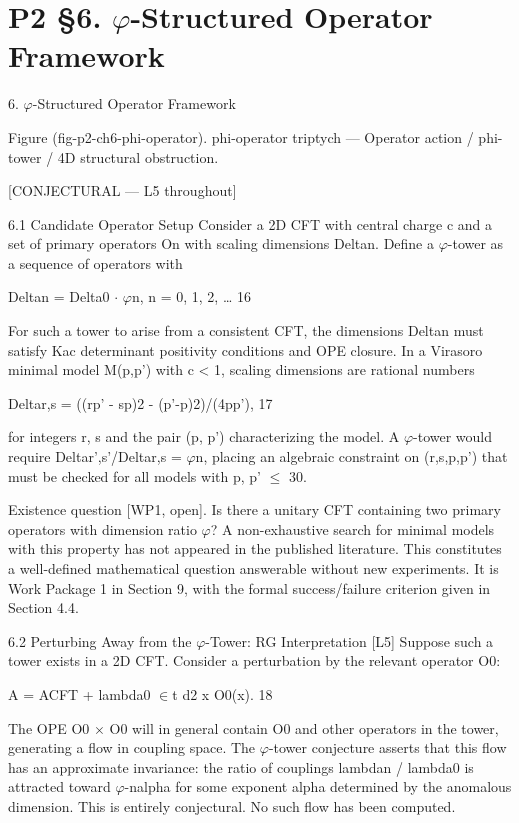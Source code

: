 
\section{P2 §6. $\varphi$-Structured Operator Framework}

6. $\varphi$-Structured Operator Framework

           Figure (fig-p2-ch6-phi-operator). phi-operator triptych --- Operator action / phi-tower / 4D
                                             structural obstruction.

  [CONJECTURAL --- L5 throughout]

  6.1 Candidate Operator Setup
  Consider a 2D CFT with central charge c and a set of primary operators On with scaling
  dimensions Deltan. Define a $\varphi$-tower as a sequence of operators with

  Deltan = Delta0 $\cdot$ $\varphi$n, n = 0, 1, 2, … 16

  For such a tower to arise from a consistent CFT, the dimensions Deltan must satisfy Kac
  determinant positivity conditions and OPE closure. In a Virasoro minimal model M(p,p')
  with c < 1, scaling dimensions are rational numbers

  Deltar,s = ((rp' - sp)2 - (p'-p)2)/(4pp'), 17

  for integers r, s and the pair (p, p') characterizing the model. A $\varphi$-tower would require
  Deltar',s'/Deltar,s = $\varphi$n, placing an algebraic constraint on (r,s,p,p') that must be
  checked for all models with p, p' $\leq$ 30.

  Existence question [WP1, open]. Is there a unitary CFT containing two primary
  operators with dimension ratio $\varphi$? A non-exhaustive search for minimal models with this
  property has not appeared in the published literature. This constitutes a well-defined
  mathematical question answerable without new experiments. It is Work Package 1 in
  Section 9, with the formal success/failure criterion given in Section 4.4.

  6.2 Perturbing Away from the $\varphi$-Tower: RG Interpretation [L5]
  Suppose such a tower exists in a 2D CFT. Consider a perturbation by the relevant
  operator O0:

  A = ACFT + lambda0 $\in$t d2 x O0(x). 18

  The OPE O0 $\times$ O0 will in general contain O0 and other operators in the tower,
  generating a flow in coupling space. The $\varphi$-tower conjecture asserts that this flow has
  an approximate invariance: the ratio of couplings lambdan / lambda0 is attracted
  toward $\varphi$-nalpha for some exponent alpha determined by the anomalous dimension.
  This is entirely conjectural. No such flow has been computed.

